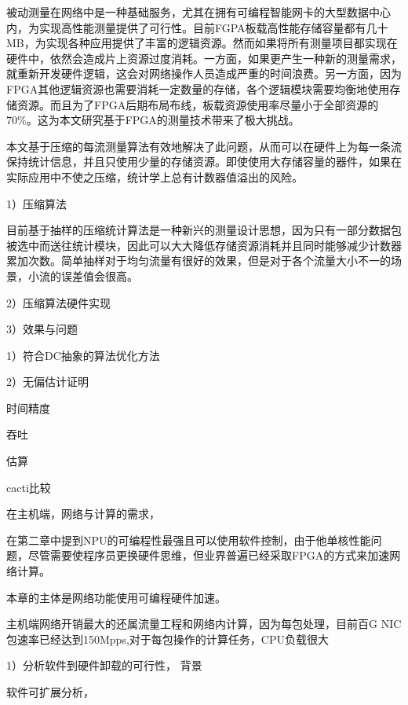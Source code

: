 
被动测量在网络中是一种基础服务，尤其在拥有可编程智能网卡的大型数据中心内，为实现高性能测量提供了可行性。目前FGPA板载高性能存储容量都有几十MB，为实现各种应用提供了丰富的逻辑资源。然而如果将所有测量项目都实现在硬件中，依然会造成片上资源过度消耗。一方面，如果更产生一种新的测量需求，就重新开发硬件逻辑，这会对网络操作人员造成严重的时间浪费。另一方面，因为FPGA其他逻辑资源也需要消耗一定数量的存储，各个逻辑模块需要均衡地使用存储资源。而且为了FPGA后期布局布线，板载资源使用率尽量小于全部资源的70\%。这为本文研究基于FPGA的测量技术带来了极大挑战。

本文基于压缩的每流测量算法有效地解决了此问题，从而可以在硬件上为每一条流保持统计信息，并且只使用少量的存储资源。即使使用大存储容量的器件，如果在实际应用中不使之压缩，统计学上总有计数器值溢出的风险。


1）压缩算法

目前基于抽样的压缩统计算法是一种新兴的测量设计思想，因为只有一部分数据包被选中而送往统计模块，因此可以大大降低存储资源消耗并且同时能够减少计数器累加次数。简单抽样对于均匀流量有很好的效果，但是对于各个流量大小不一的场景，小流的误差值会很高。

2）压缩算法硬件实现

3）效果与问题




1）符合DC抽象的算法优化方法

2）无偏估计证明








时间精度

吞吐

估算

cacti比较











在主机端，网络与计算的需求，

在第二章中提到NPU的可编程性最强且可以使用软件控制，由于他单核性能问题，尽管需要使程序员更换硬件思维，但业界普遍已经采取FPGA的方式来加速网络计算。

本章的主体是网络功能使用可编程硬件加速。

主机端网络开销最大的还属流量工程和网络内计算，因为每包处理，目前百G NIC 包速率已经达到150Mpps,对于每包操作的计算任务，CPU负载很大

1）分析软件到硬件卸载的可行性， 背景
	
	软件可扩展分析，



	



















